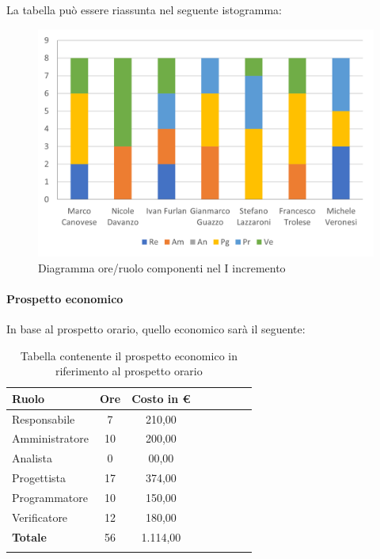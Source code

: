 La tabella può essere riassunta nel seguente istogramma:

\begin{figure}[H]
	\centering
	\includegraphics[width=0.8\linewidth]{res/images/preventivo/dettaglio_poc/1-1.png}
	\caption{Diagramma ore/ruolo componenti nel I incremento}
	\label{fig:diagramma suddivisione ruoli I incremento}
\end{figure}

\paragraph{Prospetto economico}
In base al prospetto orario, quello economico sarà il seguente:

\begin{longtable}{|l|c|c|c|c|c|c|c|}
	\hline
	\rowcolor{lighter-grayer}
	\textbf{Ruolo}  & \textbf{Ore} & \textbf{Costo in €} \\
	\hline
	\endfirsthead

	\hline
	Responsabile    & 7            & 210,00              \\
	\hline
	\hline
	Amministratore  & 10           & 200,00              \\
	\hline
	\hline
	Analista        & 0           & 00,00              \\
	\hline
	\hline
	Progettista     & 17            & 374,00                   \\
	\hline
	\hline
	Programmatore   & 10            & 150,00                   \\
	\hline
	\hline
	Verificatore    & 12            & 180,00                   \\
	\hline
	\textbf{Totale} & 56           & 1.114,00            \\
	\hline
	\rowcolor{white}
	\caption{Tabella contenente il prospetto economico in riferimento al prospetto orario}
\end{longtable}
\pagebreak

